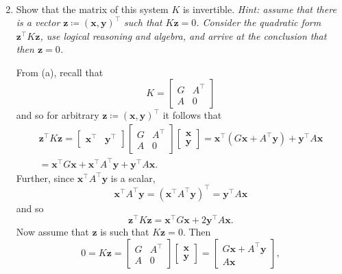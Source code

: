 \documentclass{../kin_math}
\begin{document}
\begin{questions}
\begin{enumerate}
\begin{solution}
\begin{align*}
      \end{align*}
    \end{solution}
    \item Show that the matrix of this system $K$ is invertible. \emph{Hint: assume that there is a vector $\textbf{z} \coloneqq (\textbf{x}, \textbf{y})^\top$ such that $K \textbf{z} = 0$. Consider the quadratic form $\textbf{z}^\top K \textbf{z}$, use logical reasoning and algebra, and arrive at the conclusion that then $\textbf{z} = 0$.}
    \begin{solution}
      From (a), recall that
      \begin{equation*}
        K = \begin{bmatrix} G & A^\top \\ A & 0 \end{bmatrix}
      \end{equation*}
      and so for arbitrary $\textbf{z} \coloneqq (\textbf{x}, \textbf{y})^\top$ it follows that
      \begin{multline*}
        \textbf{z}^\top K \textbf{z} = \begin{bmatrix} \textbf{x}^\top & \textbf{y}^\top \end{bmatrix} \begin{bmatrix} G & A^\top \\ A & 0 \end{bmatrix} \begin{bmatrix} \textbf{x} \\ \textbf{y} \end{bmatrix} = \textbf{x}^\top (G \textbf{x} + A^\top \textbf{y}) + \textbf{y}^\top A \textbf{x} \\
        = \textbf{x}^\top G \textbf{x} + \textbf{x}^\top A^\top \textbf{y} + \textbf{y}^\top A \textbf{x}.
      \end{multline*}
      Further, since $\textbf{x}^\top A^\top \textbf{y}$ is a scalar,
      \begin{equation*}
        \textbf{x}^\top A^\top \textbf{y} = (\textbf{x}^\top A^\top \textbf{y})^\top = \textbf{y}^\top A \textbf{x}
      \end{equation*}
      and so
      \begin{equation}
        \label{eq:arbitrary}
        \textbf{z}^\top K \textbf{z} = \textbf{x}^\top G \textbf{x} + 2 \textbf{y}^\top A \textbf{x}.
      \end{equation}
      Now assume that $\textbf{z}$ is such that $K \textbf{z} = 0$. Then
      \begin{equation*}
        0 = K \textbf{z} = \begin{bmatrix} G & A^\top \\ A & 0 \end{bmatrix} \begin{bmatrix} \textbf{x} \\ \textbf{y} \end{bmatrix} = \begin{bmatrix} G \textbf{x} + A^\top \textbf{y} \\ A \textbf{x} \end{bmatrix},

\end{equation*}
\end{solution}
\end{enumerate}
\end{questions}
\end{document}
